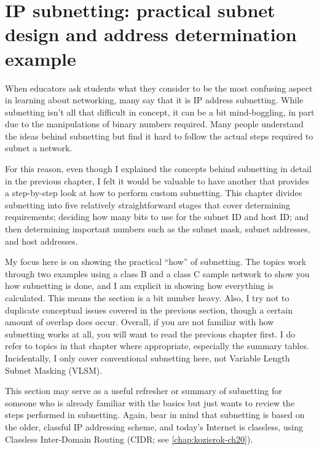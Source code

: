 \chapter{IP subnetting: practical subnet design and address determination example}
\label{chap:kozierok-ch19}

When educators ask students what they consider to be the most confusing
aspect in learning about networking, many say that it is IP address
subnetting. While subnetting isn't all that difficult in concept, it can
be a bit mind-boggling, in part due to the manipulations of binary
numbers required. Many people understand the ideas behind subnetting but
find it hard to follow the actual steps required to subnet a network.

For this reason, even though I explained the concepts behind subnetting
in detail in the previous chapter, I felt it would be valuable to have
another that provides a step-by-step look at how to perform custom
subnetting. This chapter divides subnetting into five relatively
straightforward stages that cover determining requirements; deciding how
many bits to use for the subnet ID and host ID; and then determining
important numbers such as the subnet mask, subnet addresses, and host
addresses.

My focus here is on showing the practical ``how'' of subnetting. The
topics work through two
\protect\hypertarget{ch19.htmlux5cux23idx-CHP-19-0746}{}{}examples using
a class B and a class C sample network to show you how subnetting is
done, and I am explicit in showing how everything is calculated. This
means the section is a bit number heavy. Also, I try not to duplicate
conceptual issues covered in the previous section, though a certain
amount of overlap does occur. Overall, if you are not familiar with how
subnetting works at all, you will want to read the previous chapter
first. I do refer to topics in that chapter where appropriate,
especially the summary tables. Incidentally, I only cover conventional
subnetting here, not Variable Length Subnet Masking (VLSM).

This section may serve as a useful refresher or summary of subnetting
\protect\hypertarget{ch19.htmlux5cux23idx-CHP-19-0747}{}{}for someone
who is already familiar with the basics but just wants to review the
steps performed in subnetting. Again, bear in mind that subnetting is
based on the older, classful IP addressing scheme, and today's Internet
is classless, using Classless Inter-Domain Routing (CIDR; see \vref{chap:kozierok-ch20}).

